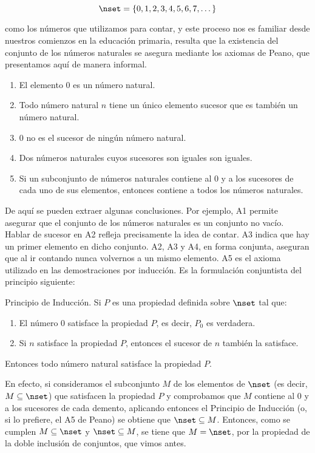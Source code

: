 \[ \nset = \{0, 1, 2, 3, 4, 5, 6, 7, \dots\} \]

\noindent como los números que utilizamos para contar, y este proceso nos es
familiar desde nuestros comienzos en la educación primaria, resulta que la
existencia del conjunto de los números naturales se asegura mediante los
axiomas de Peano, que presentamos aquí de manera informal.

\begin{enumerate}[label=\textbf{A\arabic*.}, leftmargin=1.5cm]
  \item El elemento 0 es un número natural.
  \item Todo número natural $n$ tiene un único elemento sucesor que es
    también un número natural.
  \item 0 no es el sucesor de ningún número natural.
  \item Dos números naturales cuyos sucesores son iguales son iguales.
  \item Si un subconjunto de números naturales contiene al 0 y a los
    sucesores de cada uno de sus elementos, entonces contiene a todos los
    números naturales.
\end{enumerate}

De aquí se pueden extraer algunas conclusiones. Por ejemplo, A1 permite
asegurar que el conjunto de los números naturales es un conjunto no vacío.
Hablar de sucesor en A2 refleja precisamente la idea de contar. A3 indica
que hay un primer elemento en dicho conjunto. A2, A3 y A4, en forma
conjunta, aseguran que al ir contando nunca volvernos a un mismo elemento.
A5 es el axioma utilizado en las demostraciones por inducción. Es la
formulación conjuntista del principio siguiente:


Principio de Inducción. Si $P$ es una propiedad definida sobre $\nset$ tal
que:

\begin{enumerate}
  \item El número 0 satisface la propiedad $P$, es decir, $P_0$ es
    verdadera.
  \item Si $n$ satisface la propiedad $P$, entonces el sucesor de $n$
    también la satisface.
\end{enumerate}

\noindent Entonces todo número natural satisface la propiedad $P$.

En efecto, si consideramos el subconjunto $M$ de los elementos de $\nset$
(es decir, $M \subseteq \nset$) que satisfacen la propiedad $P$ y
comprobamos que $M$ contiene al 0 y a los sucesores de cada demento,
aplicando entonces el Principio de Inducción (o, si lo prefiere, el A5 de
Peano) se obtiene que $\nset \subseteq M$. Entonces, como se cumplen $M
\subseteq \nset$ y $\nset \subseteq M$, se tiene que $M = \nset$, por la
propiedad de la doble inclusión de conjuntos, que vimos antes.

